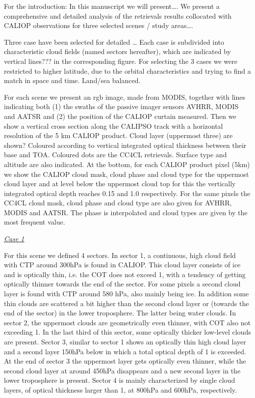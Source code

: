 {\color{red}

For the introduction: In this manuscript we will present…. We present a comprehensive and detailed analysis of the retrievals results collocated with CALIOP observations for three selected scenes / study areas….

Three case have been selected for detailed … Each case is subdivided into characteristic cloud fields (named sectors hereafter), which are indicated by vertical lines??? in the corresponding figure.
For selecting the 3 cases we were restricted to higher latitude, due to the orbital characteristics and trying to find a match in space and time. Land/sea balanced.

For each scene we present an rgb image, made from MODIS, together with lines indicating both (1) the swaths of the passive imager sensors AVHRR, MODIS and AATSR and (2) the position of the CALIOP curtain measured.
Then we show a vertical cross section along the CALIPSO track with a horizontal resolution of the 5 km CALIOP product. Cloud layer (uppermost three) are shown? Coloured according to vertical integrated optical thickness between their base and TOA. Coloured dots are the CC4CL retrievals. Surface type and altitude are also indicated. At the bottom, for each CALIOP product pixel (5km) we show the CALIOP cloud mask, cloud phase and cloud type for the uppermost cloud layer and at level below the uppermost cloud top for this the vertically integrated optical depth reaches 0.15 and 1.0 respectively. For the same pixels the CC4CL cloud mask, cloud phase and cloud type are also given for AVHRR, MODIS and AATSR. The phase is interpolated and cloud types are given by the most frequent value.

\vspace{5mm}\underline{\textit{Case 1}}\vspace{2mm}

For this scene we defined 4 sectors. In sector 1, a continuous, high cloud field with CTP around 300hPa is found in CALIOP. This cloud layer consists of ice and is optically thin, i.e. the COT does not exceed 1, with a tendency of getting optically thinner towards the end of the sector. For some pixels a second cloud layer is found with CTP around 580 hPa, also mainly being ice. In addition some thin clouds are scattered a bit higher than the second cloud layer or (towards the end of the sector) in the lower troposphere. The latter being water clouds. In sector 2, the uppermost clouds are geometrically even thinner, with COT also not exceeding 1. In the last third of this sector, some optically thicker low-level clouds are present. Sector 3, similar to sector 1 shows an optically thin high cloud layer and a second layer 150hPa below in which a total optical depth of 1 is exceeded. At the end of sector 3 the uppermost layer gets optically even thinner, while the second cloud layer at around 450hPa disappears and a new second layer in the lower troposphere is present. Sector 4 is mainly characterized by single cloud layers, of optical thickness larger than 1, at 800hPa and 600hPa, respectively. 

}
